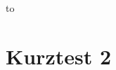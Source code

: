 %
%
%



{\parindent0pt\hbox to}
\vspace{0.5cm}

\section*{Kurztest 2}

\begin{uebungsaufgaben}



\end{uebungsaufgaben}


